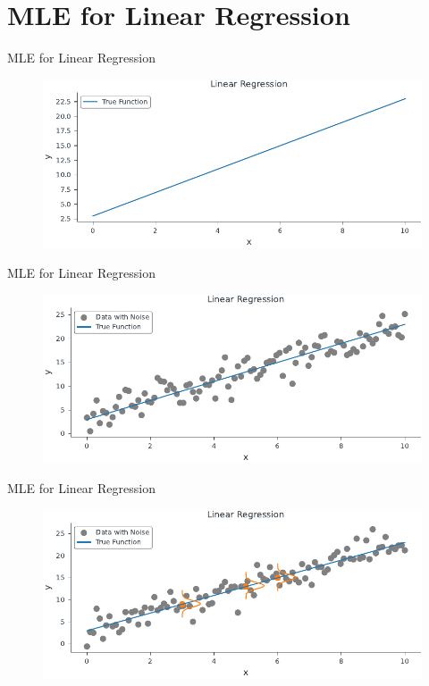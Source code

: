\documentclass{beamer}
\begin{document}
\section{MLE for Linear Regression}
\begin{frame}{MLE for Linear Regression}
\begin{figure}
                \centerline{\includegraphics[scale=0.8]{../figures/mle/true_function_lin_reg.pdf}}
\end{figure}
\end{frame}
\begin{frame}{MLE for Linear Regression}
\begin{figure}
                \centerline{\includegraphics[scale=0.8]{../figures/mle/true_function_noise_lin_reg.pdf}}
\end{figure}
\end{frame}
\begin{frame}{MLE for Linear Regression}
\begin{figure}
                \centerline{\includegraphics[scale=0.8]{../figures/mle/true_function_noise_normal_lin_reg.pdf}}
\end{figure}
\end{frame}
\end{document}
